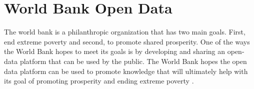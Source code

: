 \section{World Bank Open Data}

The world bank is a philanthropic organization that has two main goals.
First, end extreme poverty and second, to promote shared prosperity.
One of the ways the World Bank hopes to meet its goals is by developing
and sharing an open-data platform that can be used by the public.
The World Bank hopes the open data platform can be used to promote knowledge
that will ultimately help with its goal of promoting prosperity and ending
extreme poverty \cite{Bank2018}.


